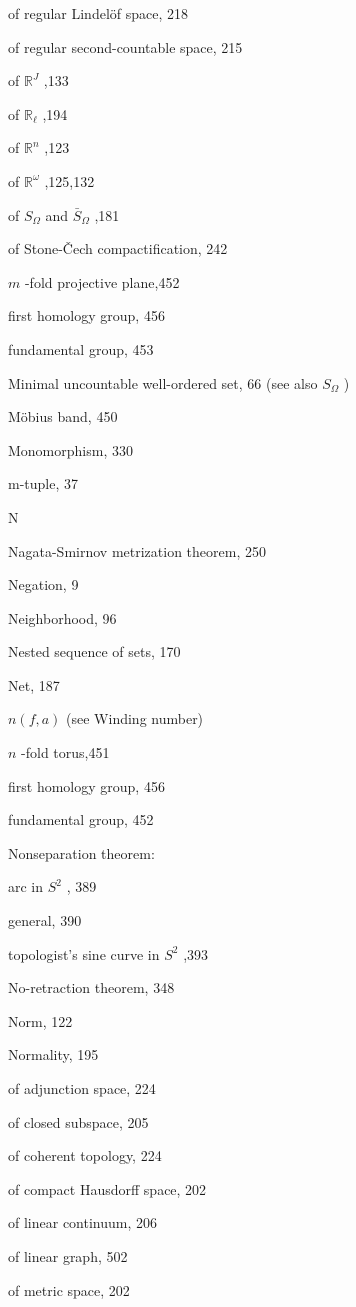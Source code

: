 of regular Lindelöf space, 218

of regular second-countable space, 215

of \({\mathbb{R}}^{J}\) ,133

of \({\mathbb{R}}_{\ell }\) ,194

of \({\mathbb{R}}^{n}\) ,123

of \({\mathbb{R}}^{\omega }\) ,125,132

of \({S}_{\Omega }\) and \({\bar{S}}_{\Omega }\) ,181

of Stone-Čech compactification, 242

\(m\) -fold projective plane,452

first homology group, 456

fundamental group, 453

Minimal uncountable well-ordered set, 66 (see also \({S}_{\Omega }\) )

Möbius band, 450

Monomorphism, 330

m-tuple, 37

N

Nagata-Smirnov metrization theorem, 250

Negation, 9

Neighborhood, 96

Nested sequence of sets, 170

Net, 187

\(n\left( {f,a}\right)\) (see Winding number)

\(n\) -fold torus,451

first homology group, 456

fundamental group, 452

Nonseparation theorem:

arc in \({S}^{2}\) , 389

general, 390

topologist’s sine curve in \({S}^{2}\) ,393

No-retraction theorem, 348

Norm, 122

Normality, 195

of adjunction space, 224

of closed subspace, 205

of coherent topology, 224

of compact Hausdorff space, 202

of linear continuum, 206

of linear graph, 502

of metric space, 202

